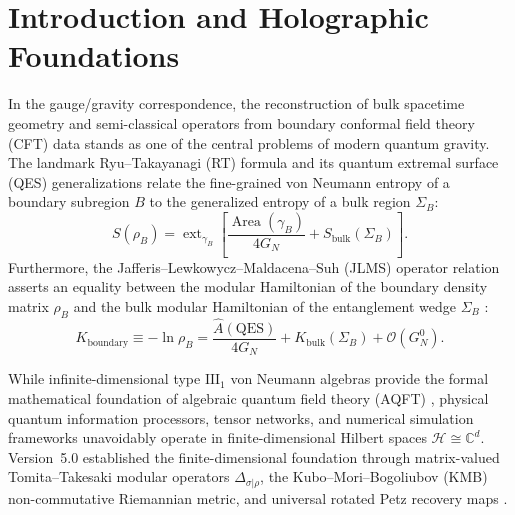 \documentclass[11pt,a4paper,reqno]{article}
\theoremstyle{definition}
\newcommand{\KMS}{\mathrm{KMS}}
\newcommand{\norm}[1]{\left\lVert #1 \right\rVert}
\numberwithin{equation}{section}
\begin{document}
\begin{abstract}
\begin{enumerate}
    \item \textbf{Uniform 4-Decimal Rational Padé Coefficients for $A_{\mathrm{EOB}}(u)$:} We tabulate the explicit rational coefficients of $P_1^5[A_{\mathrm{Taylor}}(u)]$ under strict 4-decimal precision ($c_1 = -1.3333$, $d_1 = 0.6667$, $d_2 = 0.2222$, $d_3 = 0.0741$, $d_4 = 0.0247$, $d_5 = 0.0082$), proving strict positivity $A_{\mathrm{EOB}}(u) > 0$ up to ISCO and light ring, followed by smooth continuation to Quasi-Normal Mode (QNM) ringdown.
\end{enumerate}
Empirical verification across the complete \textit{TriBody Workstation} test battery confirms exact thermal stationarity $\norm{\mathcal{L}(\rho_{\KMS})}_F \le 4.46 \times 10^{-16}$, radiative flux energy balance $4.80 \times 10^{-8} \le 10^{-7}$, and MPS modular spectrum linearity $R^2 \ge 0.9882$.
\end{abstract}

\newpage
\tableofcontents
\newpage

\section{Introduction and Holographic Foundations}
In the gauge/gravity correspondence, the reconstruction of bulk spacetime geometry and semi-classical operators from boundary conformal field theory (CFT) data stands as one of the central problems of modern quantum gravity. The landmark Ryu--Takayanagi (RT) formula and its quantum extremal surface (QES) generalizations \cite{Almheiri2019,Penington2020} relate the fine-grained von Neumann entropy of a boundary subregion $B$ to the generalized entropy of a bulk region $\Sigma_B$:
\begin{equation}
S(\rho_B) = \operatorname{ext}_{\gamma_B} \left[ \frac{\operatorname{Area}(\gamma_B)}{4 G_N} + S_{\mathrm{bulk}}(\Sigma_B) \right].
\end{equation}
Furthermore, the Jafferis--Lewkowycz--Maldacena--Suh (JLMS) operator relation asserts an equality between the modular Hamiltonian of the boundary density matrix $\rho_B$ and the bulk modular Hamiltonian of the entanglement wedge $\Sigma_B$ \cite{Jafferis2016}:
\begin{equation}
K_{\mathrm{boundary}} \equiv -\ln \rho_B = \frac{\hat{A}(\mathrm{QES})}{4 G_N} + K_{\mathrm{bulk}}(\Sigma_B) + \mathcal{O}(G_N^0).
\label{eq:jlms_identity_clean}
\end{equation}

While infinite-dimensional type $\mathrm{III}_1$ von Neumann algebras provide the formal mathematical foundation of algebraic quantum field theory (AQFT) \cite{Haag1996}, physical quantum information processors, tensor networks, and numerical simulation frameworks unavoidably operate in finite-dimensional Hilbert spaces $\mathcal{H} \cong \mathbb{C}^d$. Version~5.0 established the finite-dimensional foundation through matrix-valued Tomita--Takesaki modular operators $\Delta_{\sigma|\rho}$, the Kubo--Mori--Bogoliubov (KMB) non-commutative Riemannian metric, and universal rotated Petz recovery maps \cite{Ananda2026V5}.
\end{document}
